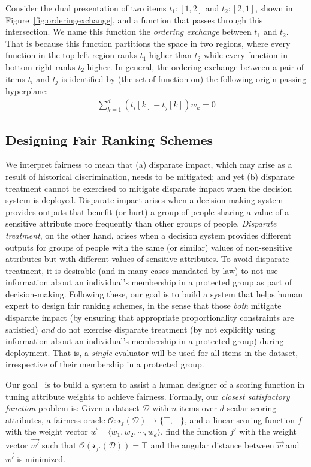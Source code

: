 Consider the dual presentation of two items $t_1:[1,2]$ and $t_2:[2,1]$, shown in Figure~\ref{fig:orderingexchange}, and a function that passes through this intersection.
We name this function the {\em ordering exchange} between $t_1$ and $t_2$.
That is because this function partitions the space in two regions, where every function in the top-left region ranks $t_1$ higher than $t_2$ while every function in bottom-right ranks $t_2$ higher.
In general, the ordering exchange between a pair of items $t_i$ and $t_j$ is identified by (the set of function on) the following origin-passing hyperplane:
\begin{align}\label{eq:mdIntersect}
\sum\limits_{k=1}^{d} (t_i[k] - t_j[k])w_k = 0
\end{align}



\subsection{Designing Fair Ranking Schemes}\label{sec:fairness} %
We interpret fairness to mean that (a) disparate impact, which may arise as a result of historical discrimination, needs to be mitigated; and yet (b) disparate treatment cannot be exercised to mitigate disparate impact when the decision system is deployed. 
Disparate impact arises when a decision making system provides outputs that benefit (or hurt) a group of people sharing a value of a sensitive attribute more frequently than other groups of people.
{\em Disparate treatment}, on the other hand, arises when a decision system provides different outputs for groups of people with the same (or similar) values of non-sensitive attributes but with different values of sensitive attributes. To avoid disparate treatment, it is desirable (and in many cases mandated by law) to not use information about an individual's membership in a protected group as part of decision-making.
Following these, our goal is to build a system that helps human expert to design fair ranking schemes, in the sense that those {\em both} mitigate disparate impact (by ensuring that appropriate proportionality constraints are satisfied) {\em and} do not exercise disparate treatment (by not explicitly using information about an individual's membership in a protected group) during deployment.  That is, a {\em single} evaluator will be used for all items in the dataset, irrespective of their membership in a protected group.

Our goal~\cite{asudeh2019designing} is to build a system to assist a human designer of a scoring function in tuning attribute weights to achieve fairness.
Formally, our {\em closest satisfactory function} problem is:
Given a dataset $\mathcal{D}$ with $n$ items over $d$ scalar scoring attributes, a fairness oracle $\mathcal{O}: \mathcal{r}_f(\mathcal{D}) \rightarrow \{\top, \bot\}$, and a linear scoring function $f$ with the weight vector $\vec{w} = \langle w_1,w_2,\cdots ,w_d\rangle$, find the function $f'$ with the weight vector $\vec{w'}$ such that $\mathcal{O}(\mathcal{r}_{f'}(\mathcal{D}))=\top$  and the angular distance between $\vec{w}$ and $\vec{w'}$ is minimized.

